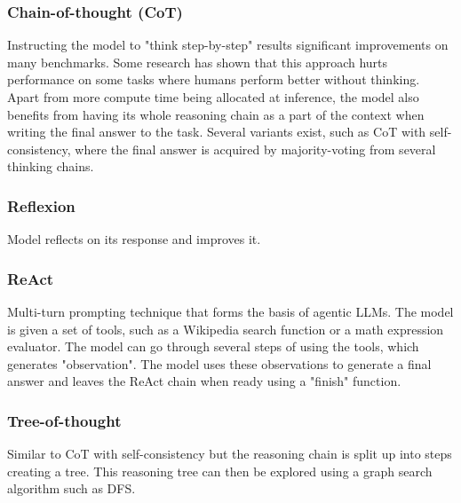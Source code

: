 \subsubsection{Chain-of-thought (CoT)}
Instructing the model to "think step-by-step" results significant improvements on many benchmarks. Some research has shown that this approach hurts performance on some tasks where humans perform better without thinking.
Apart from more compute time being allocated at inference, the model also benefits from having its whole reasoning chain as a part of the context when writing the final answer to the task.
Several variants exist, such as CoT with self-consistency, where the final answer is acquired by majority-voting from several thinking chains.
\subsubsection{Reflexion}
Model reflects on its response and improves it.
\subsubsection{ReAct}
Multi-turn prompting technique that forms the basis of agentic LLMs. The model is given a set of tools, such as a Wikipedia search function or a math expression evaluator.
The model can go through several steps of using the tools, which generates "observation". The model uses these observations to generate a final answer and leaves the ReAct chain when ready using a "finish" function.
\subsubsection{Tree-of-thought}
Similar to CoT with self-consistency but the reasoning chain is split up into steps creating a tree. This reasoning tree can then be explored using a graph search algorithm such as DFS.
